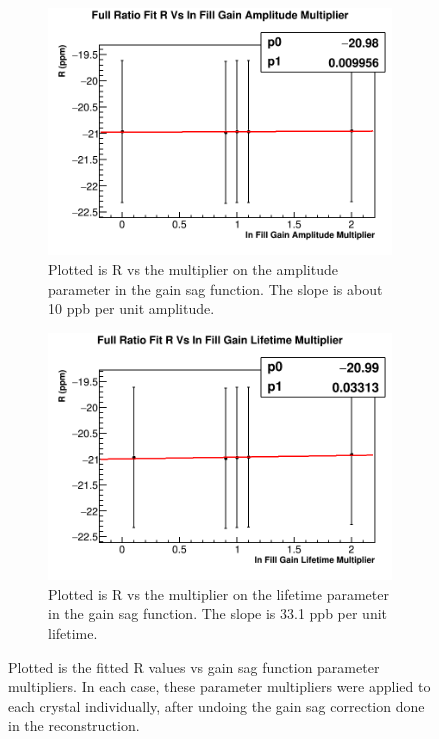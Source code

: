 		\begin{figure}[]
		\centering
		    \begin{subfigure}[t]{0.45\textwidth}
			    \centering
				\includegraphics[width=\textwidth]{R_Vs_IFG_Amp_crystals}
			    \caption{Plotted is R vs the multiplier on the amplitude parameter in the gain sag function. The slope is about 10 ppb per unit amplitude.}
		    \end{subfigure}
		    \hspace{4mm}
		    \begin{subfigure}[t]{0.45\textwidth}
			    \centering
				\includegraphics[width=\textwidth]{R_Vs_IFG_Tau_crystals}
			    \caption{Plotted is R vs the multiplier on the lifetime parameter in the gain sag function. The slope is 33.1 ppb per unit lifetime.}
		    \end{subfigure}%
		\caption[InFillGain]{Plotted is the fitted R values vs gain sag function parameter multipliers. In each case, these parameter multipliers were applied to each crystal individually, after undoing the gain sag correction done in the reconstruction.}
		\label{Fig:InFillGain}
		\end{figure}


